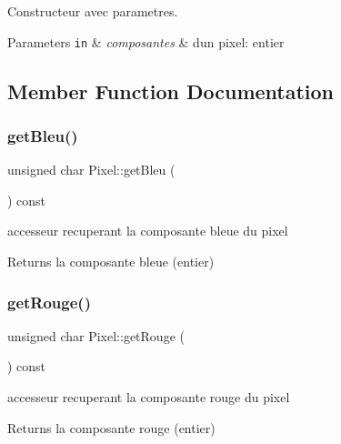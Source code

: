 Constructeur avec parametres. 


\begin{DoxyParams}[1]{Parameters}
\mbox{\tt in}  & {\em composantes} & d\textquotesingle{}un pixel\+: entier \\
\hline
\end{DoxyParams}


\subsection{Member Function Documentation}
\mbox{\label{classPixel_aa3e3cf7f2ca814ae2cfeb84cd48f3268}} 
\subsubsection{\texorpdfstring{get\+Bleu()}{getBleu()}}
{\footnotesize\ttfamily unsigned char Pixel\+::get\+Bleu (\begin{DoxyParamCaption}{ }\end{DoxyParamCaption}) const}



accesseur recuperant la composante bleue du pixel 

\begin{DoxyReturn}{Returns}
la composante bleue (entier) 
\end{DoxyReturn}
\mbox{\label{classPixel_ab0ec14a265184c9452407394a29b65d2}} 
\subsubsection{\texorpdfstring{get\+Rouge()}{getRouge()}}
{\footnotesize\ttfamily unsigned char Pixel\+::get\+Rouge (\begin{DoxyParamCaption}{ }\end{DoxyParamCaption}) const}



accesseur recuperant la composante rouge du pixel 

\begin{DoxyReturn}{Returns}
la composante rouge (entier) 
\end{DoxyReturn}
\mbox{\label{classPixel_a35afebd6965ea07c3d3c9a4c46176676}} 
